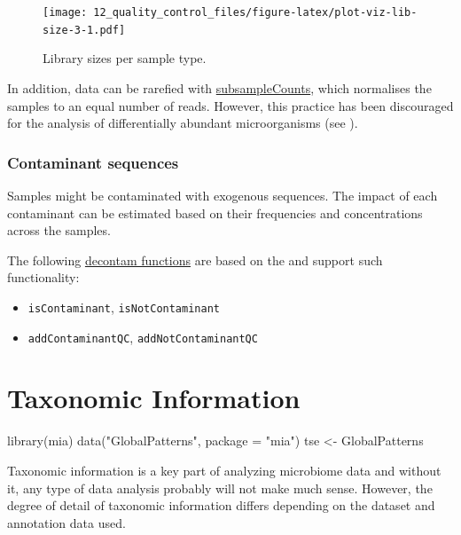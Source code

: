\documentclass[
]{book}
\newenvironment{Shaded}{\begin{snugshade}}{\end{snugshade}}
\newcommand{\AttributeTok}[1]{\textcolor[rgb]{0.77,0.63,0.00}{#1}}
\newcommand{\FunctionTok}[1]{\textcolor[rgb]{0.00,0.00,0.00}{#1}}
\newcommand{\NormalTok}[1]{#1}
\newcommand{\OtherTok}[1]{\textcolor[rgb]{0.56,0.35,0.01}{#1}}
\newcommand{\StringTok}[1]{\textcolor[rgb]{0.31,0.60,0.02}{#1}}
\providecommand{\tightlist}{%
  \setlength{\itemsep}{0pt}\setlength{\parskip}{0pt}}
\begin{document}
\begin{figure}
\centering
\texttt{[image: 12\_quality\_control\_files/figure-latex/plot-viz-lib-size-3-1.pdf]}
\caption{\label{fig:plot-viz-lib-size-3}Library sizes per sample type.}
\end{figure}

In addition, data can be rarefied with
\href{https://microbiome.github.io/mia/reference/subsampleCounts.html}{subsampleCounts},
which normalises the samples to an equal number of reads. However,
this practice has been discouraged for the analysis of differentially
abundant microorganisms (see \citep{mcmurdie2014waste}).

\hypertarget{contaminant-sequences}{%
\subsection{Contaminant sequences}\label{contaminant-sequences}}

Samples might be contaminated with exogenous sequences. The impact of
each contaminant can be estimated based on their frequencies and
concentrations across the samples.

The following \href{https://microbiome.github.io/mia/reference/isContaminant.html}{decontam
functions}
are based on the \citep{davis2018simple} and support such functionality:

\begin{itemize}
\tightlist
\item
  \texttt{isContaminant}, \texttt{isNotContaminant}
\item
  \texttt{addContaminantQC}, \texttt{addNotContaminantQC}
\end{itemize}

\hypertarget{taxonomic-information}{%
\chapter{Taxonomic Information}\label{taxonomic-information}}

\begin{Shaded}
\begin{Highlighting}[]
\FunctionTok{library}\NormalTok{(mia)}
\FunctionTok{data}\NormalTok{(}\StringTok{"GlobalPatterns"}\NormalTok{, }\AttributeTok{package =} \StringTok{"mia"}\NormalTok{)}
\NormalTok{tse }\OtherTok{\textless{}{-}}\NormalTok{ GlobalPatterns}
\end{Highlighting}
\end{Shaded}

Taxonomic information is a key part of analyzing microbiome data and without
it, any type of data analysis probably will not make much sense. However,
the degree of detail of taxonomic information differs depending on the dataset
and annotation data used.
\end{document}
